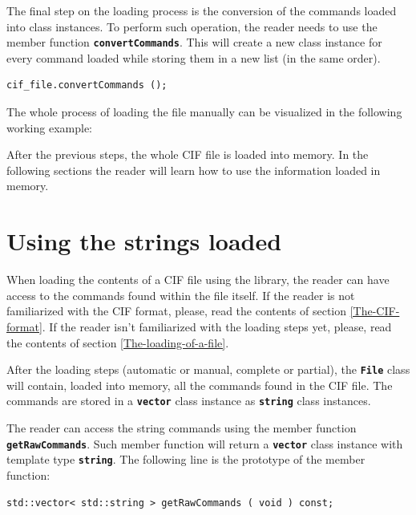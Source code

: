 \documentclass[11pt,twoside,openany,x11names,svgnames]{memoir}
\begin{document}
The final step on the loading process is the conversion of the commands loaded into class instances. To perform such operation, the reader needs to use the member function \textbf{\texttt{convertCommands}}. This will create a new class instance for every command loaded while storing them in a new list (in the same order).

\begin{lstlisting}[frame=single,style=CPPStyle]
cif_file.convertCommands ();
\end{lstlisting}

The whole process of loading the file manually can be visualized in the following working example:



After the previous steps, the whole CIF file is loaded into memory. In the following sections the reader will learn how to use the information loaded in memory.

\section{Using the strings loaded}\label{Using-the-strings-loaded}

When loading the contents of a CIF file using the library, the reader can have access to the commands found within the file itself. If the reader is not familiarized with the CIF format, please, read the contents of section \ref{The-CIF-format}. If the reader isn't familiarized with the loading steps yet, please, read the contents of section \ref{The-loading-of-a-file}.

After the loading steps (automatic or manual, complete or partial), the \textbf{\texttt{File}} class will contain, loaded into memory, all the commands found in the CIF file. The commands are stored in a \textbf{\texttt{vector}} class instance as \textbf{\texttt{string}} class instances.

The reader can access the string commands using the member function \textbf{\texttt{getRawCommands}}. Such member function will return a \textbf{\texttt{vector}} class instance with template type \textbf{\texttt{string}}. The following line is the prototype of the member function:

\begin{lstlisting}[frame=single,style=CPPStyle]
std::vector< std::string > getRawCommands ( void ) const;
\end{lstlisting}
\end{document}
